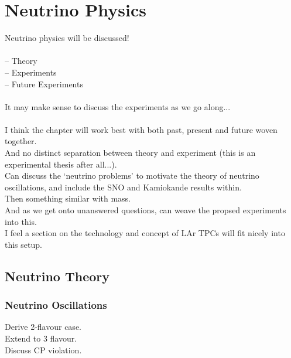 
\graphicspath{{NeutrinoPhysics/Figs/}}

\chapter{Neutrino Physics}\label{chap:NeutrinoPhysics}

Neutrino physics will be discussed! \\
\\
-- Theory\\
-- Experiments\\
-- Future Experiments\\
\\
It may make sense to discuss the experiments as we go along...\\
\\
I think the chapter will work best with both past, present and future woven together.\\
And no distinct separation between theory and experiment (this is an experimental thesis after all...).\\
Can discuss the `neutrino problems' to motivate the theory of neutrino oscillations, and include the SNO and Kamiokande results within.\\
Then something similar with mass.\\
And as we get onto unanswered questions, can weave the propsed experiments into this.\\
I feel a section on the technology and concept of LAr TPCs will fit nicely into this setup.\\

\section{Neutrino Theory}\label{sec:NeutrinoTheory}

\subsection{Neutrino Oscillations}\label{sec:NeutrinoOscillations}

Derive 2-flavour case.\\
Extend to 3 flavour.\\
Discuss CP violation.\\

